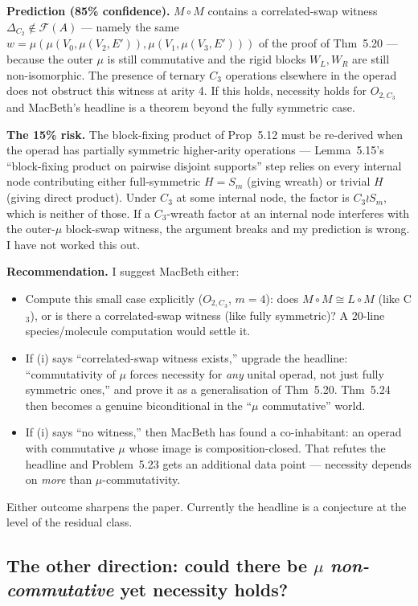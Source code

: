\documentclass[11pt]{article}
\begin{document}
\textbf{Prediction (85\% confidence).} $M \circ M$ contains a correlated-swap witness $\Delta_{C_2} \notin \mathcal F(A)$ — namely the same $w = \mu(\mu(V_0, \mu(V_2, E')), \mu(V_1, \mu(V_3, E')))$ of the proof of Thm~5.20 — because the outer $\mu$ is still commutative and the rigid blocks $W_L, W_R$ are still non-isomorphic. The presence of ternary $C_3$ operations elsewhere in the operad does not obstruct this witness at arity 4. If this holds, necessity holds for $O_{2, C_3}$ and MacBeth's headline is a theorem beyond the fully symmetric case.

\textbf{The 15\% risk.} The block-fixing product of Prop~5.12 must be re-derived when the operad has partially symmetric higher-arity operations — Lemma~5.15's ``block-fixing product on pairwise disjoint supports'' step relies on every internal node contributing either full-symmetric $H = S_m$ (giving wreath) or trivial $H$ (giving direct product). Under $C_3$ at some internal node, the factor is $C_3 \wr S_m$, which is neither of those. If a $C_3$-wreath factor at an internal node interferes with the outer-$\mu$ block-swap witness, the argument breaks and my prediction is wrong. I have not worked this out.

\textbf{Recommendation.} I suggest MacBeth either:
\begin{itemize}[leftmargin=1.5em, itemsep=1pt]
  \item[(i)] Compute this small case explicitly ($O_{2, C_3}$, $m = 4$): does $M \circ M \cong L \circ M$ (like C$_3$), or is there a correlated-swap witness (like fully symmetric)? A 20-line species/molecule computation would settle it.
  \item[(ii)] If (i) says ``correlated-swap witness exists,'' upgrade the headline: ``commutativity of $\mu$ forces necessity for \emph{any} unital operad, not just fully symmetric ones,'' and prove it as a generalisation of Thm~5.20. Thm~5.24 then becomes a genuine biconditional in the ``$\mu$ commutative'' world.
  \item[(iii)] If (i) says ``no witness,'' then MacBeth has found a co-inhabitant: an operad with commutative $\mu$ whose image is composition-closed. That refutes the headline and Problem~5.23 gets an additional data point — necessity depends on \emph{more} than $\mu$-commutativity.
\end{itemize}
Either outcome sharpens the paper. Currently the headline is a conjecture at the level of the residual class.

\subsection*{The other direction: could there be $\mu$ \emph{non-commutative} yet necessity holds?}
\end{document}
